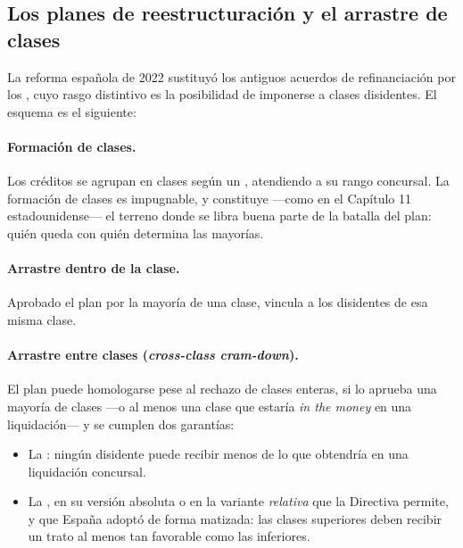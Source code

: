 \bloqueNormativo

\subsection{Los planes de reestructuración y el arrastre de clases}

La reforma española de 2022 sustituyó los antiguos acuerdos de refinanciación por los
, cuyo rasgo distintivo es la posibilidad de imponerse a
clases disidentes. El esquema es el siguiente:

\paragraph{Formación de clases.} Los créditos se agrupan en clases según un
, atendiendo a su rango concursal. La formación de clases es impugnable, y
constituye ---como en el Capítulo 11 estadounidense--- el terreno donde se libra buena parte de la
batalla del plan: quién queda con quién determina las mayorías.

\paragraph{Arrastre dentro de la clase.} Aprobado el plan por la mayoría de una clase, vincula a
los disidentes de esa misma clase.

\paragraph{Arrastre entre clases (\emph{cross-class cram-down}).} El plan puede homologarse pese al
rechazo de clases enteras, si lo aprueba una mayoría de clases ---o al menos una clase que estaría
\emph{in the money} en una liquidación--- y se cumplen dos garantías:

\begin{itemize}
  \item La : ningún disidente puede recibir
  menos de lo que obtendría en una liquidación concursal.
  \item La , en su versión absoluta o en la variante \emph{relativa}
  que la Directiva permite, y que España adoptó de forma matizada: las clases superiores deben
  recibir un trato al menos tan favorable como las inferiores.
\end{itemize}

